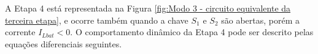 
    





A Etapa 4 está representada na Figura \ref{fig:Modo 3 - circuito equivalente da terceira etapa}, e ocorre também quando a chave $S_1$ e $S_2$ são abertas, porém a corrente $I_{Lbat}<0$. O comportamento dinâmico da Etapa 4 pode ser descrito pelas equações diferenciais seguintes.



    
